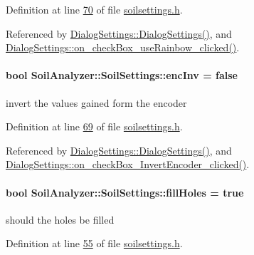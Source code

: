 Definition at line \hyperlink{soilsettings_8h_source_l00070}{70} of file \hyperlink{soilsettings_8h_source}{soilsettings.\+h}.



Referenced by \hyperlink{dialogsettings_8cpp_source_l00005}{Dialog\+Settings\+::\+Dialog\+Settings()}, and \hyperlink{dialogsettings_8cpp_source_l00295}{Dialog\+Settings\+::on\+\_\+check\+Box\+\_\+use\+Rainbow\+\_\+clicked()}.

\hypertarget{class_soil_analyzer_1_1_soil_settings_ad831e13b61fc2097219bbf7252f045d5}{}
\paragraph[{enc\+Inv}]{\setlength{\rightskip}{0pt plus 5cm}bool Soil\+Analyzer\+::\+Soil\+Settings\+::enc\+Inv = false}\label{class_soil_analyzer_1_1_soil_settings_ad831e13b61fc2097219bbf7252f045d5}
invert the values gained form the encoder 

Definition at line \hyperlink{soilsettings_8h_source_l00069}{69} of file \hyperlink{soilsettings_8h_source}{soilsettings.\+h}.



Referenced by \hyperlink{dialogsettings_8cpp_source_l00005}{Dialog\+Settings\+::\+Dialog\+Settings()}, and \hyperlink{dialogsettings_8cpp_source_l00299}{Dialog\+Settings\+::on\+\_\+check\+Box\+\_\+\+Invert\+Encoder\+\_\+clicked()}.

\hypertarget{class_soil_analyzer_1_1_soil_settings_a2c9dbe9429742aed1da9d9683da5cc1e}{}
\paragraph[{fill\+Holes}]{\setlength{\rightskip}{0pt plus 5cm}bool Soil\+Analyzer\+::\+Soil\+Settings\+::fill\+Holes = true}\label{class_soil_analyzer_1_1_soil_settings_a2c9dbe9429742aed1da9d9683da5cc1e}
should the holes be filled 

Definition at line \hyperlink{soilsettings_8h_source_l00055}{55} of file \hyperlink{soilsettings_8h_source}{soilsettings.\+h}.



